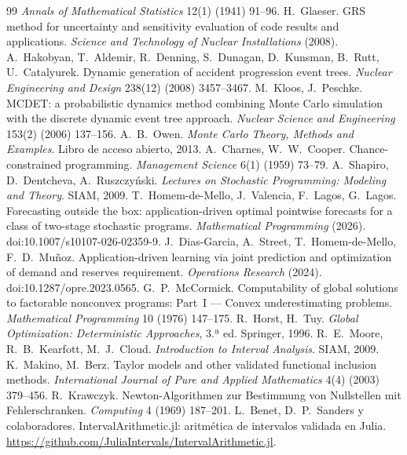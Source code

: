 \documentclass[11pt,a4paper]{article}
\newcommand{\codeus}{\textunderscore\allowbreak}
\newcommand{\code}[1]{{\small\ttfamily\let\_\codeus #1}}
\theoremstyle{plain}
\theoremstyle{definition}
\begin{document}
\begin{thebibliography}{99}
  \emph{Annals of Mathematical Statistics} 12(1) (1941) 91--96.
 H.~Glaeser. GRS method for uncertainty and sensitivity evaluation of code
  results and applications. \emph{Science and Technology of Nuclear Installations} (2008).
 A.~Hakobyan, T.~Aldemir, R.~Denning, S.~Dunagan, D.~Kunsman, B.~Rutt,
  U.~Catalyurek. Dynamic generation of accident progression event trees. \emph{Nuclear
  Engineering and Design} 238(12) (2008) 3457--3467.
 M.~Kloos, J.~Peschke. MCDET: a probabilistic dynamics method combining Monte
  Carlo simulation with the discrete dynamic event tree approach. \emph{Nuclear Science and
  Engineering} 153(2) (2006) 137--156.
 A.~B.~Owen. \emph{Monte Carlo Theory, Methods and Examples}. Libro de
  acceso abierto, 2013.
 A.~Charnes, W.~W.~Cooper. Chance-constrained programming.
  \emph{Management Science} 6(1) (1959) 73--79.
 A.~Shapiro, D.~Dentcheva, A.~Ruszczyński. \emph{Lectures on Stochastic
  Programming: Modeling and Theory}. SIAM, 2009.
 T.~Homem-de-Mello, J.~Valencia, F.~Lagos, G.~Lagos. Forecasting outside the
  box: application-driven optimal pointwise forecasts for a class of two-stage stochastic
  programs. \emph{Mathematical Programming} (2026). doi:10.1007/s10107-026-02359-9.
 J.~Dias-Garcia, A.~Street, T.~Homem-de-Mello, F.~D.~Muñoz.
  Application-driven learning via joint prediction and optimization of demand and reserves
  requirement. \emph{Operations Research} (2024). doi:10.1287/opre.2023.0565.
 G.~P.~McCormick. Computability of global solutions to factorable
  nonconvex programs: Part~I --- Convex underestimating problems. \emph{Mathematical
  Programming} 10 (1976) 147--175.
 R.~Horst, H.~Tuy. \emph{Global Optimization: Deterministic Approaches},
  3.ª ed. Springer, 1996.
 R.~E.~Moore, R.~B.~Kearfott, M.~J.~Cloud. \emph{Introduction to Interval
  Analysis}. SIAM, 2009.
 K.~Makino, M.~Berz. Taylor models and other validated functional inclusion
  methods. \emph{International Journal of Pure and Applied Mathematics} 4(4) (2003) 379--456.
 R.~Krawczyk. Newton-Algorithmen zur Bestimmung von Nullstellen mit
  Fehlerschranken. \emph{Computing} 4 (1969) 187--201.
 L.~Benet, D.~P.~Sanders y colaboradores. \code{IntervalArithmetic.jl}:
  aritmética de intervalos validada en Julia.
  \url{https://github.com/JuliaIntervals/IntervalArithmetic.jl}.

\end{thebibliography}
\end{document}
